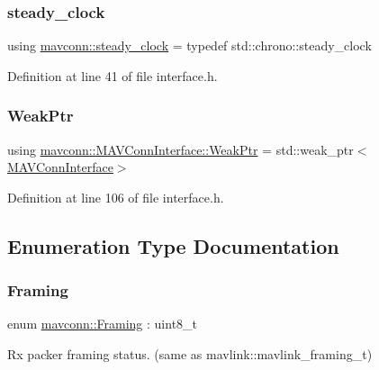 \subsubsection{\texorpdfstring{steady\_clock}{steady\_clock}}
{\footnotesize\ttfamily using \mbox{\hyperlink{group__mavconn_gab7fe4e29d643505aafb15c532a9338d3}{mavconn\+::steady\+\_\+clock}} = typedef std\+::chrono\+::steady\+\_\+clock}



Definition at line 41 of file interface.\+h.

\mbox{\label{group__mavconn_ga010ca3b237199e0ebb7b850b1f3ea0ba}} 
\subsubsection{\texorpdfstring{WeakPtr}{WeakPtr}}
{\footnotesize\ttfamily using \mbox{\hyperlink{group__mavconn_ga010ca3b237199e0ebb7b850b1f3ea0ba}{mavconn\+::\+M\+A\+V\+Conn\+Interface\+::\+Weak\+Ptr}} =  std\+::weak\+\_\+ptr$<$\mbox{\hyperlink{classmavconn_1_1MAVConnInterface}{M\+A\+V\+Conn\+Interface}}$>$}



Definition at line 106 of file interface.\+h.



\subsection{Enumeration Type Documentation}
\mbox{\label{group__mavconn_gac93e6f8262bcc6008b4882ae6213f494}} 
\subsubsection{\texorpdfstring{Framing}{Framing}}
{\footnotesize\ttfamily enum \mbox{\hyperlink{group__mavconn_gac93e6f8262bcc6008b4882ae6213f494}{mavconn\+::\+Framing}} \+: uint8\+\_\+t\hspace{0.3cm}{\ttfamily [strong]}}



Rx packer framing status. (same as {\ttfamily mavlink\+::mavlink\+\_\+framing\+\_\+t}) 

